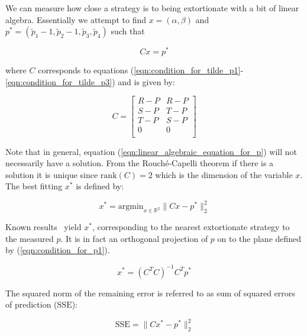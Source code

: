 \documentclass[a4paper]{article}
\newcommand{\SSe}{\text{SSE}}
\begin{document}
We can measure how close a strategy is to being extortionate with a bit of
linear algebra. Essentially we attempt to find \(x=(\alpha, \beta)\) and
\(p^*=(\tilde p_1 - 1, \tilde p_2 - 1, \tilde p_3, \tilde p_4)\) such that

\begin{equation}\label{eqn:linear_algebraic_equation_for_p}
    Cx= p^*
\end{equation}

where \(C\) corresponds to equations
(\ref{eqn:condition_for_tilde_p1}-\ref{eqn:condition_for_tilde_p3}) and is
given by:

\begin{equation}\label{eqn:definition_of_C}
    C =
    \begin{bmatrix}
        R - P & R- P \\
        S - P & T- P \\
        T - P & S- P \\
        0     & 0 \\
    \end{bmatrix}
\end{equation}

Note that in general, equation (\ref{eqn:linear_algebraic_equation_for_p}) will
not necessarily have a solution. From the Rouch\'{e}-Capelli theorem if there is
a solution it is unique since \(\text{rank}(C)=2\) which is the dimension of the
variable \(x\). The best fitting \(x^*\) is defined by:

\begin{equation}\label{eqn:x_star}
    x^* = \text{argmin}_{x\in\mathbb{R}^2}\|C x- p^*\|_2^2
\end{equation}

Known results~\cite{kutner2004applied, rao1973linear, wakefield2013bayesian} yield
$x^*$, corresponding to the nearest extortionate strategy to the
measured \(p\). It is in fact an orthogonal projection of \(p\) on to the plane
defined by (\ref{eqn:condition_for_p1}).

\begin{equation}\label{eqn:x_star_formula}
    x^* = {\left(C^{T}C\right)}^{-1}C^{T}p^{*}
\end{equation}

The squared norm of the remaining error is referred to as sum of squared errors
of prediction (\(\SSe\)):

\begin{equation}\label{eqn:r_squared}
    \SSe = \|C x^*- p^*\|_2^2
\end{equation}
\end{document}
